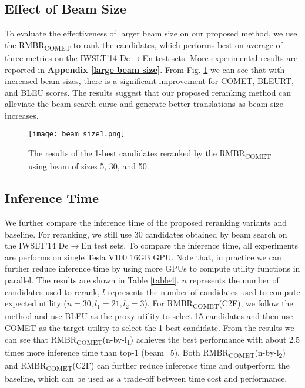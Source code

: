 \documentclass{article}
\begin{document}
\subsection{Effect of Beam Size} \label{sec:beamsize}
To evaluate the effectiveness of larger beam size on our proposed method, we use the RMBR\textsubscript{COMET} to rank the candidates, which performs best on average of three metrics on the IWSLT’14 De$\to$En test sets. More experimental results are reported in \textbf{Appendix \ref{large beam size}}. From Fig. \ref{f2} we can see that with increased beam sizes, there is a significant improvement for COMET, BLEURT, and BLEU scores. The results suggest that our proposed reranking method can alleviate the beam search curse and generate better translations as beam size increases.

\begin{figure}
\centering
\texttt{[image: beam\_size1.png]}
\caption{The results of the 1-best candidates reranked by the RMBR\textsubscript{COMET} using beam of sizes 5, 30, and 50.}
\label{f2}
\end{figure}

\subsection{Inference Time}
We further compare the inference time of the proposed reranking variants and baseline. For reranking, we still use 30 candidates obtained by beam search on the IWSLT’14 De$\to$En test sets. To compare the inference time, all experiments are performs on single Tesla V100 16GB GPU. Note that, in practice we can further reduce inference time by using more GPUs to compute utility functions in parallel. The results are shown in Table \ref{table4}. $n$ represents the number of candidates used to rerank, $l$ represents the number of candidates used to compute expected utility ($n=30,l_1=21,l_2=3$). For RMBR\textsubscript{COMET}(C2F), we follow the method \cite{31} and use BLEU as the proxy utility to select 15 candidates and then use COMET as the target utility to select the 1-best candidate.
From the results we can see that RMBR\textsubscript{COMET}(n-by-l\textsubscript{1}) achieves the best performance with about 2.5 times more inference time than top-1 (beam=5). Both RMBR\textsubscript{COMET}(n-by-l\textsubscript{2}) and RMBR\textsubscript{COMET}(C2F) can further reduce inference time and outperform the baseline, which can be used as a trade-off between time cost and performance. 
\end{document}

